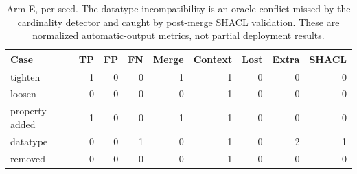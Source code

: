 \begin{table}[ht]\centering\small
\begin{tabular}{lrrrrrrrr}\toprule
Case & TP & FP & FN & Merge & Context & Lost & Extra & SHACL \\ \midrule
tighten & 1 & 0 & 0 & 1 & 1 & 0 & 0 & 0 \\
loosen & 0 & 0 & 0 & 0 & 1 & 0 & 0 & 0 \\
property-added & 1 & 0 & 0 & 1 & 1 & 0 & 0 & 0 \\
datatype & 0 & 0 & 1 & 0 & 1 & 0 & 2 & 1 \\
removed & 0 & 0 & 0 & 0 & 1 & 0 & 0 & 0 \\
\bottomrule\end{tabular}
\caption{Arm E, per seed. The datatype incompatibility is an oracle conflict missed by the cardinality detector and caught by post-merge SHACL validation. These are normalized automatic-output metrics, not partial deployment results.}
\label{tab:schema}\end{table}
